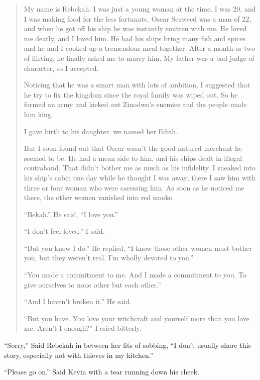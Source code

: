 \begin{quote}
My name is Rebekah. I was just a young woman at the time.
I was 20, and I was making food for the less fortunate.
Oscar Seaweed was a man of 22, and when he got off his ship he was instantly smitten with me.
He loved me dearly, and I loved him.
He had his ships bring many fish and spices and he and I cooked up a tremendous meal together.
After a month or two of flirting, he finally asked me to marry him. My father was a bad judge of character, so I accepted.

Noticing that he was a smart man with lots of ambition, I suggested that he try to fix the kingdom since the royal family was wiped out. So he formed an army and kicked out Zinodwo's enemies and the people made him king.

I gave birth to his daughter, we named her Edith.

But I soon found out that Oscar wasn't the good natured merchant he seemed to be.
He had a mean side to him, and his ships dealt in illegal contraband.
That didn't bother me as much as his infidelity.
I sneaked into his ship's cabin one day while he thought I was away; there I saw him with three or four woman who were caressing him. As soon as he noticed me there, the other women vanished into red smoke.

``Bekah.'' He said, ``I love you.''

``I don't feel loved.'' I said.

``But you know I do.'' He replied, ``I know those other women must bother you, but they weren't real. I'm wholly devoted to you.''

``You made a commitment to me. And I made a commitment to you. To give ourselves to none other but each other.''

``And I haven't broken it.'' He said.

``But you have. You love your witchcraft and yourself more than you love me. Aren't I enough?'' I cried bitterly.

\end{quote}

``Sorry,'' Said Rebekah in between her fits of sobbing, ``I don't usually share this story, especially not with thieves in my kitchen.''

``Please go on.'' Said Kevin with a tear running down his cheek.

